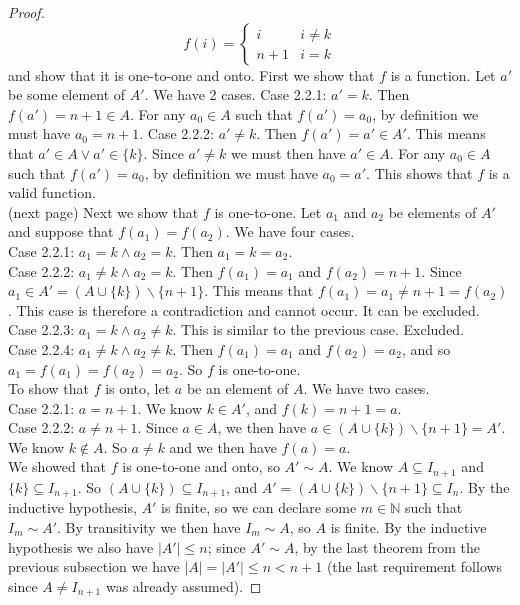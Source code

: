\documentclass{report}
\theoremstyle{definition}
\begin{document}
\begin{proof}
\begin{equation*}
f(i)=\begin{cases}
i&i\neq k\\
n+1&i=k
\end{cases}
\end{equation*}
and show that it is one-to-one and onto. First we show that $f$ is a function. Let $a'$ be some element of $A'$.
We have 2 cases. Case 2.2.1: $a'=k$. Then $f(a')=n+1\in A$. For any $a_0\in A$ such that $f(a')=a_0$, by definition
we must have $a_0=n+1$. Case 2.2.2: $a'\neq k$. Then $f(a')=a'\in A'$. This means that
$a'\in A\lor a'\in\{k\}$. Since $a'\neq k$ we must then have $a'\in A$.
For any $a_0\in A$ such that $f(a')=a_0$, by definition
we must have $a_0=a'$. This shows that $f$ is a valid function.\\
(next page)\newpage
Next we show that $f$ is one-to-one. Let $a_1$ and $a_2$ be elements of $A'$ and suppose that $f(a_1)=f(a_2)$.
We have four cases.\\
\indent Case 2.2.1: $a_1=k\land a_2=k$. Then $a_1=k=a_2$.\\
\indent Case 2.2.2: $a_1\neq k\land a_2=k$. Then $f(a_1)=a_1$ and $f(a_2)=n+1$.
Since $a_1\in A'=(A\cup\{k\})\backslash\{n+1\}$. This means that $f(a_1)=a_1\neq n+1=f(a_2)$. This case is therefore
a contradiction and cannot occur. It can be excluded.\\
\indent Case 2.2.3: $a_1=k\land a_2\neq k$. This is similar to the previous case. Excluded.\\
\indent Case 2.2.4: $a_1\neq k\land a_2\neq k$. Then $f(a_1)=a_1$ and $f(a_2)=a_2$, and
so $a_1=f(a_1)=f(a_2)=a_2$. So $f$ is one-to-one.\\
\indent To show that $f$ is onto, let $a$ be an element of $A$. We have two cases.\\
\indent Case 2.2.1: $a=n+1$. We know $k\in A'$, and $f(k)=n+1=a$.\\
\indent Case 2.2.2: $a\neq n+1$. Since $a\in A$, we then have $a\in(A\cup\{k\})\backslash\{n+1\}=A'$. We know 
$k\notin A$. So $a\neq k$ and we then have $f(a)=a$.\\
\indent We showed that $f$ is one-to-one and onto, so $A'\sim A$. We know $A\subseteq I_{n+1}$ and 
$\{k\}\subseteq I_{n+1}$. So $(A\cup\{k\})\subseteq I_{n+1}$, and $A'=(A\cup\{k\})\backslash\{n+1\}\subseteq I_{n}$.
By the inductive hypothesis, $A'$ is finite, so we can declare some $m\in\mathbb N$ such that $I_m\sim A'$. By
transitivity we then have $I_m\sim A$, so $A$ is finite.
By the inductive hypothesis we also have $|A'|\leq n$; since $A'\sim A$, by the last theorem from the previous 
subsection we have $|A|=|A'|\leq n<n+1$ (the last requirement follows since $A\neq I_{n+1}$ was already assumed).
\end{proof}
\end{document}

